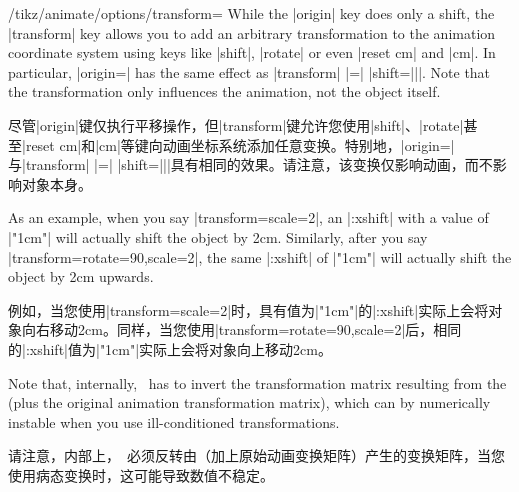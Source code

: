 \begin{key}{/tikz/animate/options/transform=}
    While the |origin| key does only a shift, the |transform| key allows you to
    add an arbitrary transformation to the animation coordinate system using
    keys like |shift|, |rotate| or even |reset cm| and |cm|. In particular,
    |origin=| has the same effect as |transform| |=|
    |{shift=||}|. Note that the transformation only influences the
    animation, not the object itself.

    尽管|origin|键仅执行平移操作，但|transform|键允许您使用|shift|、|rotate|甚至|reset cm|和|cm|等键向动画坐标系统添加任意变换。特别地，|origin=|与|transform| |=| |{shift=||}|具有相同的效果。请注意，该变换仅影响动画，而不影响对象本身。

    As an example, when you say |transform={scale=2}|, an |:xshift| with a
    value of |"1cm"| will actually shift the object by 2cm. Similarly, after
    you say |transform={rotate=90,scale=2}|, the same |:xshift| of |"1cm"| will
    actually shift the object by 2cm upwards.

    例如，当您使用|transform={scale=2}|时，具有值为|"1cm"|的|:xshift|实际上会将对象向右移动2cm。同样，当您使用|transform={rotate=90,scale=2}|后，相同的|:xshift|值为|"1cm"|实际上会将对象向上移动2cm。

    Note that, internally, \tikzname\ has to invert the transformation matrix
    resulting from the  (plus the original animation
    transformation matrix), which can by numerically instable when you use
    ill-conditioned transformations.
    
    请注意，内部上，\tikzname\ 必须反转由（加上原始动画变换矩阵）产生的变换矩阵，当您使用病态变换时，这可能导致数值不稳定。


\begin{codeexample}[
    preamble={\usetikzlibrary{animations}},
    animation list={0.5,1,1.5,2},
]
\end{codeexample}
\begin{codeexample}[
    preamble={\usetikzlibrary{animations}},
    animation list={0.5,1,1.5,2},
]
\end{codeexample}
\end{key}


